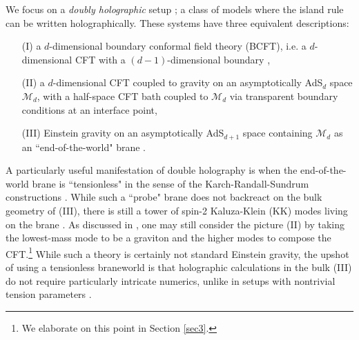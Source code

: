 \documentclass[12pt,a4paper]{article}
\begin{document}
We focus on a \textit{doubly holographic} setup \cite{Almheiri:2019psy}; a class of models where the island rule can be written holographically. These systems have three equivalent descriptions:
\begin{itemize}
\item[(I)] a $d$-dimensional boundary conformal field theory (BCFT), i.e. a $d$-dimensional CFT with a $(d-1)$-dimensional boundary \cite{McAvity:1995zd,Cardy:2004hm},
\item[(II)] a $d$-dimensional CFT coupled to gravity on an asymptotically AdS$_d$ space $\mathcal{M}_d$, with a half-space CFT bath coupled to $\mathcal{M}_d$ via transparent boundary conditions at an interface point,
\item[(III)] Einstein gravity on an asymptotically AdS$_{d+1}$ space containing $\mathcal{M}_d$ as an ``end-of-the-world" brane \cite{Randall:1999vf,Karch:2000ct,Karch:2000gx}.
\end{itemize}

A particularly useful manifestation of double holography is when the end-of-the-world brane is ``tensionless" in the sense of the Karch-Randall-Sundrum constructions \cite{Randall:1999vf,Karch:2000ct,Karch:2000gx}. While such a ``probe" brane does not backreact on the bulk geometry of (III), there is still a tower of spin-2 Kaluza-Klein (KK) modes living on the brane \cite{Karch:2000ct}. As discussed in \cite{Geng:2020qvw}, one may still consider the picture (II) by taking the lowest-mass mode to be a graviton and the higher modes to compose the CFT.\footnote{We elaborate on this point in Section \ref{sec3}.} While such a theory is certainly not standard Einstein gravity, the upshot of using a tensionless braneworld is that holographic calculations in the bulk (III) do not require particularly intricate numerics, unlike in setups with nontrivial tension parameters \cite{Almheiri:2019psy,Geng:2020fxl,Geng:2021eps}.
\end{document}
